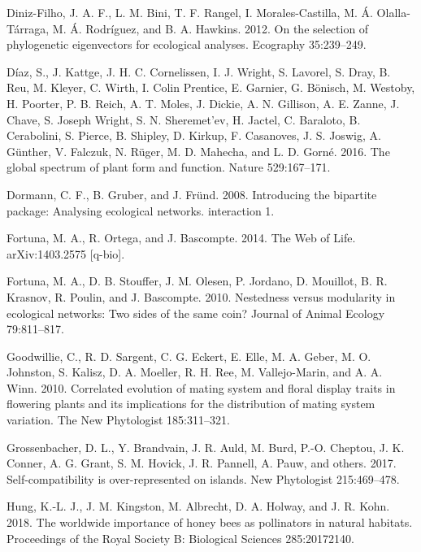 \documentclass[11pt,a4paper,]{article}
\begin{document}
\hypertarget{ref-diniz-filho2012}{}
Diniz-Filho, J. A. F., L. M. Bini, T. F. Rangel, I. Morales-Castilla, M.
Á. Olalla-Tárraga, M. Á. Rodríguez, and B. A. Hawkins. 2012. On the
selection of phylogenetic eigenvectors for ecological analyses.
Ecography 35:239--249.

\hypertarget{ref-diaz2016}{}
Díaz, S., J. Kattge, J. H. C. Cornelissen, I. J. Wright, S. Lavorel, S.
Dray, B. Reu, M. Kleyer, C. Wirth, I. Colin Prentice, E. Garnier, G.
Bönisch, M. Westoby, H. Poorter, P. B. Reich, A. T. Moles, J. Dickie, A.
N. Gillison, A. E. Zanne, J. Chave, S. Joseph Wright, S. N. Sheremet'ev,
H. Jactel, C. Baraloto, B. Cerabolini, S. Pierce, B. Shipley, D. Kirkup,
F. Casanoves, J. S. Joswig, A. Günther, V. Falczuk, N. Rüger, M. D.
Mahecha, and L. D. Gorné. 2016. The global spectrum of plant form and
function. Nature 529:167--171.

\hypertarget{ref-dormann2008}{}
Dormann, C. F., B. Gruber, and J. Fründ. 2008. Introducing the bipartite
package: Analysing ecological networks. interaction 1.

\hypertarget{ref-fortuna2014}{}
Fortuna, M. A., R. Ortega, and J. Bascompte. 2014. The Web of Life.
arXiv:1403.2575 {[}q-bio{]}.

\hypertarget{ref-fortuna2010}{}
Fortuna, M. A., D. B. Stouffer, J. M. Olesen, P. Jordano, D. Mouillot,
B. R. Krasnov, R. Poulin, and J. Bascompte. 2010. Nestedness versus
modularity in ecological networks: Two sides of the same coin? Journal
of Animal Ecology 79:811--817.

\hypertarget{ref-goodwillie2010}{}
Goodwillie, C., R. D. Sargent, C. G. Eckert, E. Elle, M. A. Geber, M. O.
Johnston, S. Kalisz, D. A. Moeller, R. H. Ree, M. Vallejo-Marin, and A.
A. Winn. 2010. Correlated evolution of mating system and floral display
traits in flowering plants and its implications for the distribution of
mating system variation. The New Phytologist 185:311--321.

\hypertarget{ref-grossenbacher2017}{}
Grossenbacher, D. L., Y. Brandvain, J. R. Auld, M. Burd, P.-O. Cheptou,
J. K. Conner, A. G. Grant, S. M. Hovick, J. R. Pannell, A. Pauw, and
others. 2017. Self-compatibility is over-represented on islands. New
Phytologist 215:469--478.

\hypertarget{ref-hung2018}{}
Hung, K.-L. J., J. M. Kingston, M. Albrecht, D. A. Holway, and J. R.
Kohn. 2018. The worldwide importance of honey bees as pollinators in
natural habitats. Proceedings of the Royal Society B: Biological
Sciences 285:20172140.
\end{document}
